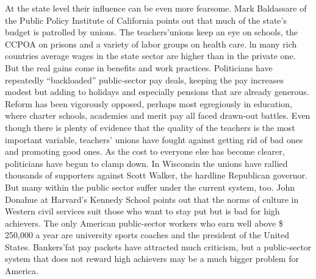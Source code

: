 At the state level their influence can be even more fearsome. Mark Baldassare of the Public Policy Institute of California points out that much of the state’s budget is patrolled by unions. The teachers’unions keep an eye on schools, the CCPOA on prisons and a variety of labor groups on health care.
ln many rich countries average wages in the state sector are higher than in the private one. But the real gains come in benefits and work practices. Politicians have repeatedly “backloaded” public-sector pay deals, keeping the pay increases modest but adding to holidays and especially pensions that are already generous.
Reform has been vigorously opposed, perhaps most egregiously in education, where charter schools, academies and merit pay all faced drawn-out battles. Even though there is plenty of evidence that the quality of the teachers is the most important variable, teachers’ unions have fought against getting rid of bad ones and promoting good ones.
As the cost to everyone else has become clearer, politicians have begun to clamp down. In Wisconsin the unions have rallied thousands of supporters against Scott Walker, the hardline Republican governor. But many within the public sector suffer under the current system, too.
John Donahue at Harvard’s Kennedy School points out that the norms of culture in Western civil services suit those who want to stay put but is bad for high achievers. The only American public-sector workers who earn well above \$ 250,000 a year are university sports coaches and the president of the United States. Bankers’fat pay packets have attracted much criticism, but a public-sector system that does not reward high achievers may be a much bigger problem for America.

